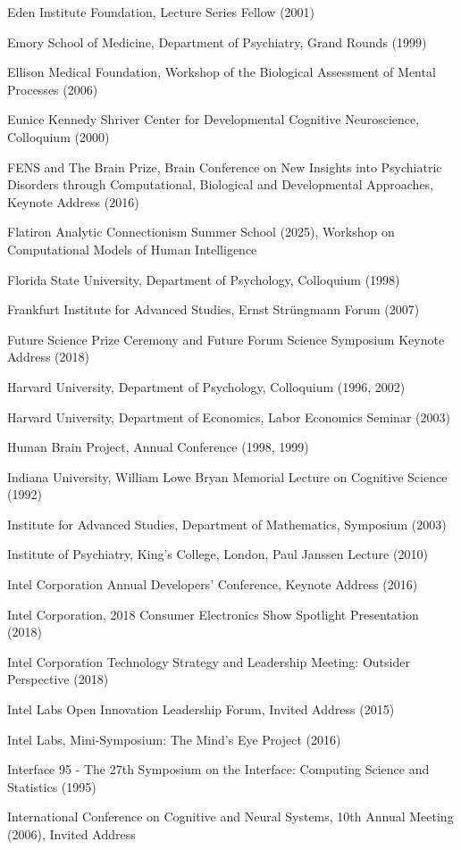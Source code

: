 \documentclass[10 pt]{article}
\begin{document}
Eden Institute Foundation, Lecture Series Fellow (2001)

Emory School of Medicine, Department of Psychiatry, Grand Rounds (1999)

Ellison Medical Foundation, Workshop of the Biological Assessment of Mental Processes (2006)

Eunice Kennedy Shriver Center for Developmental Cognitive Neuroscience, Colloquium (2000)

FENS and The Brain Prize, Brain Conference on New Insights into Psychiatric Disorders through Computational, Biological and Developmental Approaches, Keynote Address (2016)

Flatiron Analytic Connectionism Summer School (2025), Workshop on Computational Models of Human Intelligence

Florida State University, Department of Psychology, Colloquium (1998)

Frankfurt Institute for Advanced Studies, Ernst Strüngmann Forum (2007)

Future Science Prize Ceremony and Future Forum Science Symposium Keynote Address (2018)

Harvard University, Department of Psychology, Colloquium (1996, 2002)

Harvard University, Department of Economics, Labor Economics Seminar (2003)

Human Brain Project, Annual Conference (1998, 1999)

Indiana University, William Lowe Bryan Memorial Lecture on Cognitive Science (1992)

Institute for Advanced Studies, Department of Mathematics, Symposium (2003)

Institute of Psychiatry, King’s College, London, Paul Janssen Lecture (2010)

Intel Corporation Annual Developers’ Conference, Keynote Address (2016)

Intel Corporation, 2018 Consumer Electronics Show Spotlight Presentation (2018)

Intel Corporation Technology Strategy and Leadership Meeting: Outsider Perspective (2018)

Intel Labs Open Innovation Leadership Forum, Invited Address (2015)

Intel Labs, Mini-Symposium: The Mind’s Eye Project (2016)

Interface 95 - The 27th Symposium on the Interface: Computing Science and Statistics (1995)

International Conference on Cognitive and Neural Systems, 10th Annual Meeting (2006), Invited Address
\end{document}
